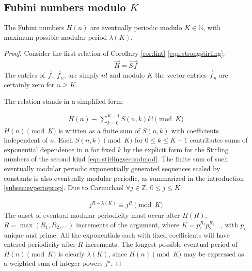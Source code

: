 \documentclass[12pt,reqno]{article}
\begin{document}
\subsection{Fubini numbers modulo $K$}
\begin{theorem}\label{thm:fubinimodk}
	The Fubini numbers $H(n)$ are eventually periodic modulo $K \in \mathbb{N}$, with maximum possible modular period $\lambda(K)$.

	\begin{proof}
		Consider the first relation of Corollary \ref{cor:lint} \eqref{eqn:strongstirling}.
		\begin{align}
			\vec{H} = \hat{S}\vec{f}\nonumber
		\end{align}
		The entries of $\vec{f}$, $\vec{f}_{n}$, are simply $n!$ and modulo $K$ the vector entries $\vec{f}_{n}$ are certainly zero for $n \geq K$.

		The relation stands in a simplified form:

		\begin{align}
			H(n) \equiv \sum_{k = 0}^{K - 1} S(n,k) k! \pmod {K}\label{eqn:stirlingsecondmod}
		\end{align}
		$H(n)\pmod {K}$ is written as a finite sum of $S(n,k)$ with coefficients independent of $n$. Each $S(n,k) \pmod {K}$ for $0 \leq k \leq K - 1$ contributes sums of exponential dependence in $n$  for fixed $k$ by the explicit form for the Stirling numbers of the second kind \eqref{eqn:stirlingsecondmod}. The finite sum of such eventually modular periodic exponentially generated sequences scaled by constants is also eventually modular periodic, as summarized in the introduction \ref{subsec:evperioprop}. Due to Carmichael $\forall j \in \mathbb{Z}$, $0 \leq j \leq K$:

		\begin{align}
			j^{R + \lambda(K)} \equiv j^{R} \pmod {K}
		\end{align}
		The onset of eventual modular periodicity must occur after $H(R)$, $R = \max(R_{1}, R_{2}, \ldots)$ increments of the argument, where $K = p_{1}^{R_{1}} p_{2}^{R_{2}} \ldots$, with $p_{i}$ unique and prime. All the exponentials each with fixed coefficients will have entered periodicity after $R$ increments. The longest possible eventual period of $H(n) \pmod {K}$ is clearly $\lambda(K)$, since $H(n) \pmod {K}$ may be expressed as a weighted sum of integer powers $j^{n}$.
		
	\end{proof}
\end{theorem}
\end{document}
